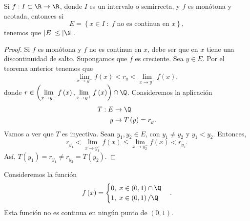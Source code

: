 \begin{ftheorem}[]
\normalfont Si $\displaystyle f : I \subset \R \to \R $, donde $\displaystyle I $ es un intervalo o semirrecta, y $\displaystyle f $ es monótona y acotada, entonces si
\[E = \left\{ x \in I \; : \; f \; \text{no es continua en } x\right\}  , \]
tenemos que $\displaystyle \left|E\right| \leq \left|\N\right| $.
\end{ftheorem}
\begin{proof}
Si $\displaystyle f $ es monótona y $\displaystyle f $ no es continua en $\displaystyle x $, debe ser que en $\displaystyle x $ tiene una discontinuidad de salto. Supongamos que $\displaystyle f $ es creciente. Sea $\displaystyle y \in E $. Por el teorema anterior tenemos que 
\[\lim_{x \to y^{-}}f\left(x\right) < r_{y} < \lim_{x \to y^{+}}f\left(x\right) , \]
donde $\displaystyle r \in \left(\lim_{x \to y^{-}}f\left(x\right), \lim_{x \to y^{+}}f\left(x\right)\right) \cap \Q $. Consideremos la aplicación 
\[
\begin{split}
	T: E & \to \Q \\
	y & \to T\left(y\right) = r_{y}.
\end{split}
\]
Vamos a ver que $\displaystyle T $ es inyectiva. Sean $\displaystyle y_{1}, y_{2} \in E $, con $\displaystyle y_{1} \neq y_{2} $ y $\displaystyle y_{1} < y_{2} $. Entonces, 
\[r_{y_{1}}<\lim_{x \to y_{1}^{+}}f\left(x\right) \leq \lim_{x \to y_{2}^{-}}f\left(x\right) < r_{y_{2}} .\]
Así, $\displaystyle T\left(y_{1}\right) = r_{y_{1}} \neq r_{y_{2}} = T\left(y_{2}\right) $.
\end{proof}
\begin{eg}
\normalfont Consideremos la función
\[f\left(x\right) = 
\begin{cases}
0, \; x \in \left(0,1\right) \cap \Q \\
1, \; x \in \left(0,1\right) / \Q
\end{cases}
.\]
Esta función no es continua en ningún punto de $\displaystyle \left(0,1\right) $.
\end{eg}
